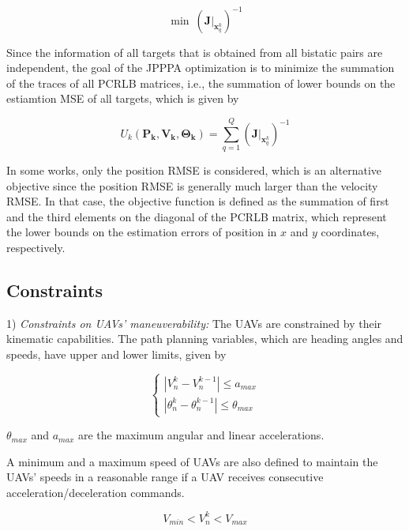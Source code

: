 \documentclass[12pt,journal,draftclsnofoot,onecolumn]{IEEEtran}
\begin{document}
\begin{equation}
    \min\ (\mathbf{J}|_{\mathbf{x}_q^k})^{-1}
\end{equation}

Since the information of all targets that is obtained from all bistatic pairs are independent, the goal of the JPPPA optimization is to minimize the summation of the traces of all PCRLB matrices, i.e., the summation of lower bounds on the estiamtion MSE of all targets, which is given by

\begin{equation}
    U_k(\mathbf{P_k},\mathbf{V_k},\mathbf{\Theta_k})=\sum_{q=1}^Q(\mathbf{J}|_{\mathbf{x}_q^k})^{-1}
\end{equation}

In some works\cite{xie2017joint}, only the position RMSE is considered, which is an alternative objective since the position RMSE is generally much larger than the velocity RMSE. In that case, the objective function is defined as the summation of first and the third elements on the diagonal of the PCRLB matrix, which represent the lower bounds on the estimation errors of position in $x$ and $y$ coordinates, respectively.

\subsection{Constraints}
1) \emph{Constraints on UAVs' maneuverability:} The UAVs are constrained by their kinematic capabilities. The path planning variables, which are heading angles and speeds, have upper and lower limits, given by 

\begin{equation}
	\left\{
	\begin{array}{lr}
		|V_n^k-V_n^{k-1}|\leq a_{max}
		\\|\theta_n^k-\theta_n^{k-1}|\leq \theta_{max}
	\end{array}
	\right.
	\label{UAV maneuverability}
\end{equation}

$\theta_{max}$ and $a_{max}$ are the maximum angular and linear accelerations.

A minimum and a maximum speed of UAVs are also defined to maintain the UAVs' speeds in a reasonable range if a UAV receives consecutive acceleration/deceleration commands.

\begin{equation}
	V_{min}<V_n^k<V_{max}
	\label{UAV speed}
\end{equation}
\end{document}
